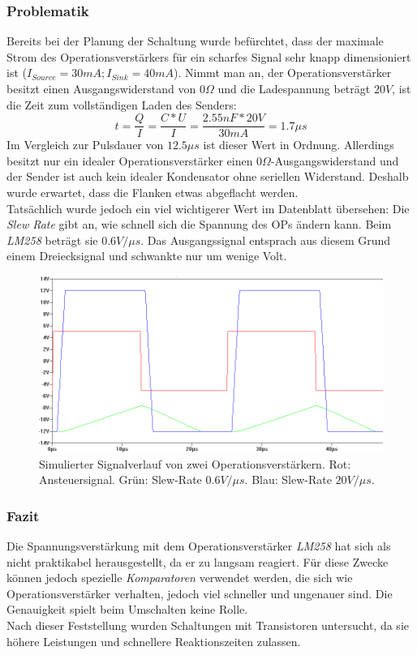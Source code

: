 \subsubsection{Problematik}
Bereits bei der Planung der Schaltung wurde befürchtet, dass der maximale Strom des Operationsverstärkers für ein scharfes Signal sehr knapp dimensioniert ist ($I_{Source}=30mA; I_{Sink}=40mA$). Nimmt man an, der Operationsverstärker besitzt einen Ausgangswiderstand von $0 \Omega$ und die Ladespannung beträgt $20V$, ist die Zeit zum vollständigen Laden des Senders:
\begin{equation}
t=\frac{Q}{I}=\frac{C*U}{I}=\frac{2.55nF*20V}{30mA}=1.7\mu s
\end{equation}
Im Vergleich zur Pulsdauer von $12.5\mu s$ ist dieser Wert in Ordnung. Allerdings besitzt nur ein idealer Operationsverstärker einen $0\Omega$-Ausgangswiderstand und der Sender ist auch kein idealer Kondensator ohne seriellen Widerstand. Deshalb wurde erwartet, dass die Flanken etwas abgeflacht werden.\\
Tatsächlich wurde jedoch ein viel wichtigerer Wert im Datenblatt übersehen: Die \textit{Slew Rate} gibt an, wie schnell sich die Spannung des OPs ändern kann. Beim \textit{LM258} beträgt sie $0.6V/\mu s$. Das Ausgangssignal entsprach aus diesem Grund einem Dreiecksignal und schwankte nur um wenige Volt.
\begin{figure}[H] %
\centering
\includegraphics[scale=0.6]{images/signalverlauf_opamps.png}
\caption{Simulierter Signalverlauf von zwei Operationsverstärkern. Rot: Ansteuersignal. Grün: Slew-Rate $0.6V/\mu s$. Blau: Slew-Rate $20V/\mu s$.} \label{img:I2}
\end{figure}

\subsubsection{Fazit}
Die Spannungsverstärkung mit dem Operationsverstärker \textit{LM258} hat sich als nicht praktikabel herausgestellt, da er zu langsam reagiert. Für diese Zwecke können jedoch spezielle \textit{Komparatoren} verwendet werden, die sich wie Operationsverstärker verhalten, jedoch viel schneller und ungenauer sind. Die Genauigkeit spielt beim Umschalten keine Rolle.\\
Nach dieser Feststellung wurden Schaltungen mit Transistoren untersucht, da sie höhere Leistungen und schnellere Reaktionszeiten zulassen.


